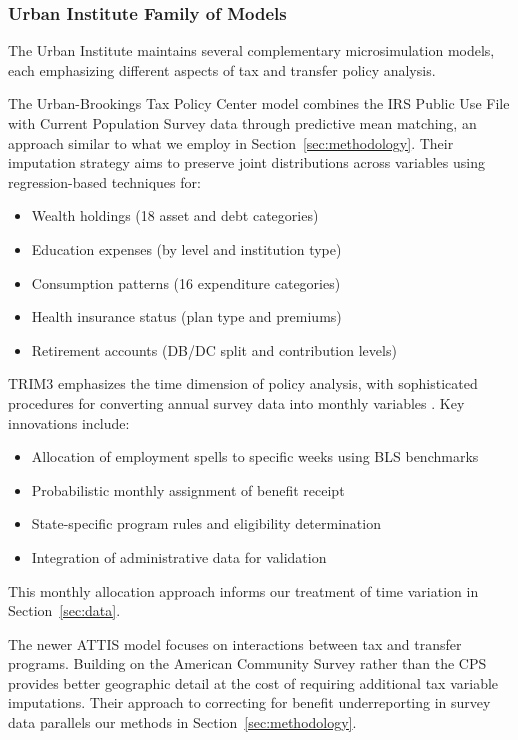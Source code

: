 \subsubsection{Urban Institute Family of Models}

The Urban Institute maintains several complementary microsimulation models, each emphasizing different aspects of tax and transfer policy analysis.

The Urban-Brookings Tax Policy Center model \cite{tpc2022} combines the IRS Public Use File with Current Population Survey data through predictive mean matching, an approach similar to what we employ in Section~\ref{sec:methodology}. Their imputation strategy aims to preserve joint distributions across variables using regression-based techniques for:

\begin{itemize}
    \item Wealth holdings (18 asset and debt categories)
    \item Education expenses (by level and institution type)
    \item Consumption patterns (16 expenditure categories)
    \item Health insurance status (plan type and premiums)
    \item Retirement accounts (DB/DC split and contribution levels)
\end{itemize}

TRIM3 emphasizes the time dimension of policy analysis, with sophisticated procedures for converting annual survey data into monthly variables \cite{trim2024}. Key innovations include:

\begin{itemize}
    \item Allocation of employment spells to specific weeks using BLS benchmarks
    \item Probabilistic monthly assignment of benefit receipt
    \item State-specific program rules and eligibility determination
    \item Integration of administrative data for validation
\end{itemize}

This monthly allocation approach informs our treatment of time variation in Section~\ref{sec:data}.

The newer ATTIS model \cite{attis2024} focuses on interactions between tax and transfer programs. Building on the American Community Survey rather than the CPS provides better geographic detail at the cost of requiring additional tax variable imputations. Their approach to correcting for benefit underreporting in survey data parallels our methods in Section~\ref{sec:methodology}.

